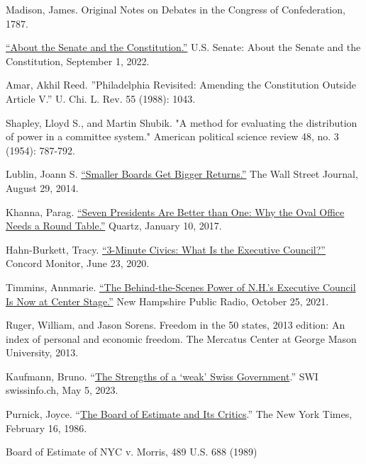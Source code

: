 \documentclass{article}
\begin{document}
\begin{thebibliography}{20}
Madison, James. Original Notes on Debates in the Congress of Confederation, 1787.

\href{https://www.senate.gov/about/origins-foundations/senate-and-constitution.htm}{“About the Senate and the Constitution.”} U.S. Senate: About the Senate and the Constitution, September 1, 2022.

Amar, Akhil Reed. ”Philadelphia Revisited: Amending the Constitution Outside Article V.” U. Chi. L. Rev. 55 (1988): 1043.

Shapley, Lloyd S., and Martin Shubik. "A method for evaluating the distribution of power in a committee system." American political science review 48, no. 3 (1954): 787-792.

Lublin, Joann S. \href{https://www.wsj.com/articles/smaller-boards-get-bigger-returns-1409078628}{“Smaller Boards Get Bigger Returns.”} The Wall Street Journal, August 29, 2014. 

Khanna, Parag. \href{https://qz.com/876260/seven-presidents-are-better-than-one-why-the-oval-office-needs-a-round-table}{“Seven Presidents Are Better than One: Why the Oval Office Needs a Round Table.”} Quartz, January 10, 2017.

Hahn-Burkett, Tracy. \href{https://www.concordmonitor.com/What-is-the-Executive-Council-34817477}{“3-Minute Civics: What Is the Executive Council?”} Concord Monitor, June 23, 2020.

Timmins, Annmarie. \href{https://www.nhpr.org/nh-news/2021-10-25/executive-council}{“The Behind-the-Scenes Power of N.H.’s Executive Council Is Now at Center Stage.”} New Hampshire Public Radio, October 25, 2021. 

Ruger, William, and Jason Sorens. Freedom in the 50 states, 2013 edition: An index of personal and economic freedom. The Mercatus Center at George Mason University, 2013.

Kaufmann, Bruno. “\href{https://www.swissinfo.ch/eng/business/the-strengths-of-a--weak--swiss-government/48483858. }{The Strengths of a ‘weak’ Swiss Government}.” SWI swissinfo.ch, May 5, 2023. 

Purnick, Joyce. “\href{https://www.nytimes.com/1986/02/16/weekinreview/the-board-of-estimate-and-its-critics.html}{The Board of Estimate and Its Critics}.” The New York Times, February 16, 1986.

Board of Estimate of NYC v. Morris, 489 U.S. 688 (1989)


\end{thebibliography}
\end{document}
